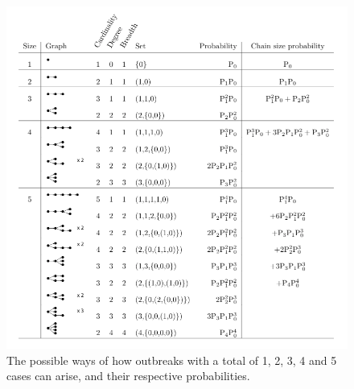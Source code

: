 \documentclass{imammb}
\numberwithin{equation}{section}
\begin{document}
\begin{figure}
    \centering
    \includegraphics{Fig1.png}
    \caption{The possible ways of how outbreaks with a total of 1, 2, 3, 4 and 5 cases can arise, and their respective probabilities. }
    \label{fig:chainsdiagram}
\end{figure}
\end{document}
